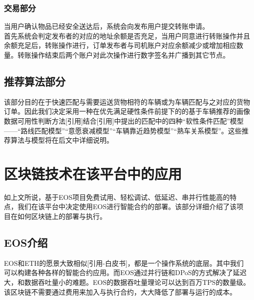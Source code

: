 \documentclass[UTF8]{ctexart}
\begin{document}
\begin{multicols}{2}
  \subsubsection{交易部分}
  当用户确认物品已经安全送达后，系统会向发布用户提交转账申请。\\
  \indent 首先系统会判定发布者的对应的地址余额是否充足，当用户同意进行转账操作并且余额充足后，转账操作进行，订单发布者与司机账户对应余额减少或增加相应数量。转账操作结束后两个账户对此次操作进行数字签名并广播到其它节点。
  \subsection{推荐算法部分}
  该部分目的在于快速匹配与需要运送货物相符的车辆或为车辆匹配与之对应的货物订单。因此我们决定采用一种在优先满足硬性条件前提下的的基于车辆推荐的画像数据可用性判断方法[引用]结合[引用]中提出的匹配中的四种“软性条件匹配”模型——“路线匹配模型”“意愿衰减模型”“车辆靠近趋势模型”“熟车关系模型”。这些推荐算法与模型将在后文中详细说明。
  \section{区块链技术在该平台中的应用}
  如上文所说，基于EOS项目免费试用、轻松调试、低延迟、串并行性能高的特点，我们在该平台中决定使用EOS进行智能合约的部署。该部分详细介绍了该项目在如何区块链上的部署与执行。
  \subsection{EOS介绍}
  \indent EOS和ETH的愿景大致相似[引用-白皮书]，都是一个操作系统的底层。其中我们可以构建各种各样的智能合约应用。而EOS通过并行链和DPoS的方式解决了延迟大，和数据吞吐量小的难题。EOS的数据吞吐量理论可以达到百万TPS的数量级。该区块链不需要通过费用来加入与执行合约，大大降低了部署与运行的成本。\\

\end{multicols}
\end{document}
